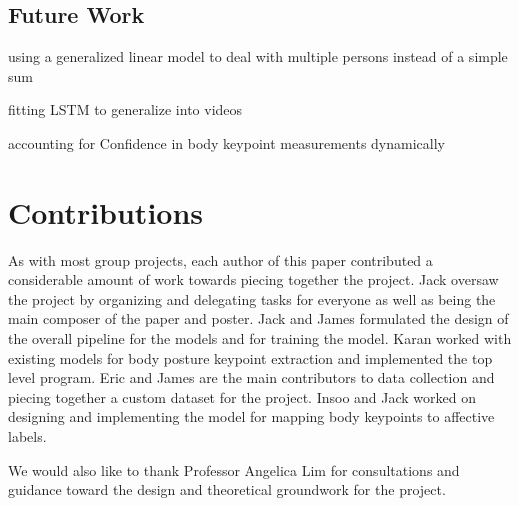 \documentclass{article}
\begin{document}
\subsection{Future Work}

using a generalized linear model to deal with multiple persons instead of a simple sum

fitting LSTM to generalize into videos

accounting for Confidence in body keypoint measurements dynamically

\section{Contributions}

As with most group projects, each author of this paper contributed a considerable amount of work towards piecing together the project. Jack oversaw the project by organizing and delegating tasks for everyone as well as being the main composer of the paper and poster. Jack and James formulated the design of the overall pipeline for the models and for training the model. Karan worked with existing models for body posture keypoint extraction and implemented the top level program. Eric and James are the main contributors to data collection and piecing together a custom dataset for the project. Insoo and Jack worked on designing and implementing the model for mapping body keypoints to affective labels.

We would also like to thank Professor Angelica Lim for consultations and guidance toward the design and theoretical groundwork for the project.



\end{document}
